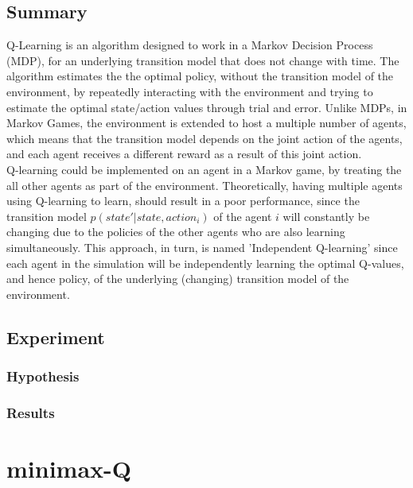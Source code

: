 \documentclass[a4paper,10pt]{article}
\begin{document}
\subsection{Summary}
Q-Learning is an algorithm designed to work in a Markov Decision Process (MDP), for an underlying transition model that does not change with time. The algorithm estimates the the optimal policy, without the transition model of the environment, by repeatedly interacting with the environment and trying to estimate the optimal state/action values through trial and error. Unlike MDPs, in Markov Games, the environment is extended to host a multiple number of agents, which means that the transition model depends on the joint action of the agents, and each agent receives a different reward as a result of this joint action.\\
Q-learning could be implemented on an agent in a Markov game, by treating the all other agents as part of the environment. Theoretically, having multiple agents using Q-learning to learn, should result in a poor performance, since the transition model $p(state'|state, action_{i})$ of the agent $i$ will constantly be changing due to the policies of the other agents who are also learning simultaneously. This approach, in turn, is named 'Independent Q-learning' since each agent in the simulation will be independently learning the optimal Q-values, and hence policy, of the underlying (changing) transition model of the environment.


\subsection{Experiment}


\subsubsection{Hypothesis}


\subsubsection{Results}








\section{minimax-Q}
\end{document}
